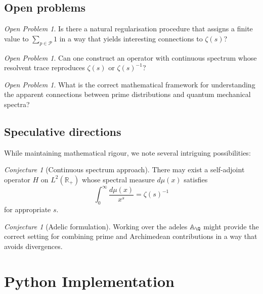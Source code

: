 \documentclass[11pt,a4paper]{article}
\theoremstyle{definition}
\theoremstyle{remark}
\newtheorem{conjecture}[theorem]{Conjecture}
\newtheorem{openproblem}[theorem]{Open Problem}
\newcommand{\R}{\mathbb{R}}
\newcommand{\calP}{\mathcal{P}}
\begin{document}
\subsection{Open problems}

\begin{openproblem}
Is there a natural regularisation procedure that assigns a finite value to 
$\sum_{p \in \calP} 1$ in a way that yields interesting connections to $\zeta(s)$?
\end{openproblem}

\begin{openproblem}
Can one construct an operator with continuous spectrum whose resolvent trace 
reproduces $\zeta(s)$ or $\zeta(s)^{-1}$?
\end{openproblem}

\begin{openproblem}
What is the correct mathematical framework for understanding the apparent 
connections between prime distributions and quantum mechanical spectra?
\end{openproblem}

\subsection{Speculative directions}

While maintaining mathematical rigour, we note several intriguing possibilities:

\begin{conjecture}[Continuous spectrum approach]
There may exist a self-adjoint operator $H$ on $L^2(\R_+)$ whose spectral measure 
$d\mu(x)$ satisfies
\[
\int_0^\infty \frac{d\mu(x)}{x^s} = \zeta(s)^{-1}
\]
for appropriate $s$.
\end{conjecture}

\begin{conjecture}[Adelic formulation]
Working over the adeles $\mathbb{A}_\Q$ might provide the correct setting for 
combining prime and Archimedean contributions in a way that avoids divergences.
\end{conjecture}

\appendix

\section{Python Implementation}\label{app:code}
\end{document}
